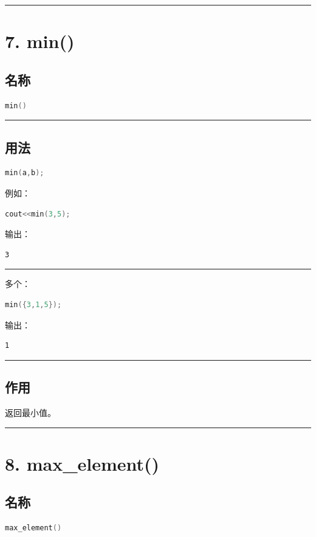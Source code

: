\documentclass[9pt,twocolumn]{extarticle}
\begin{document}
\noindent\rule{\linewidth}{0.4pt}

\section{7. min()}

\subsection{名称}
\begin{lstlisting}[language=C++]
min()
\end{lstlisting}

\noindent\rule{\linewidth}{0.4pt}

\subsection{用法}
\begin{lstlisting}[language=C++]
min(a,b);
\end{lstlisting}
例如：
\begin{lstlisting}[language=C++]
cout<<min(3,5);
\end{lstlisting}
输出：
\begin{lstlisting}
3
\end{lstlisting}

\noindent\rule{\linewidth}{0.4pt}

多个：
\begin{lstlisting}[language=C++]
min({3,1,5});
\end{lstlisting}
输出：
\begin{lstlisting}
1
\end{lstlisting}

\noindent\rule{\linewidth}{0.4pt}

\subsection{作用}
返回最小值。

\noindent\rule{\linewidth}{0.4pt}

\section{8. max\_element()}

\subsection{名称}
\begin{lstlisting}[language=C++]
max_element()
\end{lstlisting}
\end{document}
